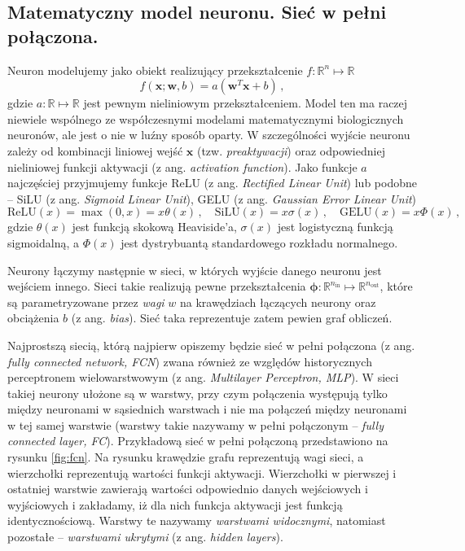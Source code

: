 \documentclass{myclass}
\numberwithin{equation}{subsection}
\begin{document}
\subsection{Matematyczny model neuronu. Sieć w pełni połączona.}

Neuron modelujemy jako obiekt realizujący przekształcenie \(f: \mathbb{R}^n \mapsto \mathbb{R}\)
\[
f(\bm{x}; \bm{w}, b) = a\left( \bm{w}^T\bm{x} + b \right)\,,
\]
gdzie \(a: \mathbb{R} \mapsto \mathbb{R}\) jest pewnym nieliniowym przekształceniem. Model ten ma
raczej niewiele wspólnego ze współczesnymi modelami matematycznymi biologicznych neuronów, ale jest
o nie w luźny sposób oparty. W szczególności wyjście neuronu zależy od kombinacji liniowej wejść
\(\bm{x}\) (tzw. \textit{preaktywacji}) oraz odpowiedniej nieliniowej funkcji aktywacji (z ang.
\textit{activation function}). Jako funkcje \(a\) najczęściej przyjmujemy funkcje ReLU (z ang.
\textit{Rectified Linear Unit}) lub podobne -- SiLU (z ang. \textit{Sigmoid Linear Unit}), GELU (z
ang. \textit{Gaussian Error Linear Unit})
\[
\mathrm{ReLU}(x) = \max(0, x) = x\theta(x)\,,\quad \mathrm{SiLU}(x) = x \sigma(x)\,,\quad \mathrm{GELU}(x) = x \Phi(x)\,,
\]
gdzie \(\theta(x)\) jest funkcją skokową Heaviside'a, \(\sigma(x)\) jest logistyczną funkcją
sigmoidalną, a \(\Phi(x)\) jest dystrybuantą standardowego rozkładu normalnego.

Neurony łączymy następnie w sieci, w których wyjście danego neuronu jest wejściem innego. Sieci
takie realizują pewne przekształcenia \(\bm{\phi}: \mathbb{R}^{n_\text{in}} \mapsto
\mathbb{R}^{n_\text{out}}\), które są parametryzowane przez \emph{wagi} \(w\) na krawędziach
łączących neurony oraz obciążenia \(b\) (z ang. \textit{bias}). Sieć taka reprezentuje zatem pewien
graf obliczeń. 

Najprostszą siecią, którą najpierw opiszemy będzie sieć w pełni połączona (z ang. \textit{fully
connected network, FCN}) zwana również ze względów historycznych perceptronem wielowarstwowym (z
ang. \textit{Multilayer Perceptron, MLP}). W sieci takiej neurony ułożone są w warstwy, przy czym
połączenia występują tylko między neuronami w sąsiednich warstwach i nie ma połączeń między
neuronami w tej samej warstwie (warstwy takie nazywamy w pełni połączonym -- \textit{fully connected
layer, FC}). Przykładową sieć w pełni połączoną przedstawiono na rysunku \ref{fig:fcn}. Na rysunku
krawędzie grafu reprezentują wagi sieci, a wierzchołki reprezentują wartości funkcji aktywacji.
Wierzchołki w pierwszej i ostatniej warstwie zawierają wartości odpowiednio danych wejściowych i
wyjściowych i zakładamy, iż dla nich funkcja aktywacji jest funkcją identycznościową. Warstwy te
nazywamy \emph{warstwami widocznymi}, natomiast pozostałe -- \emph{warstwami ukrytymi} (z ang.
\textit{hidden layers}). 
\end{document}
